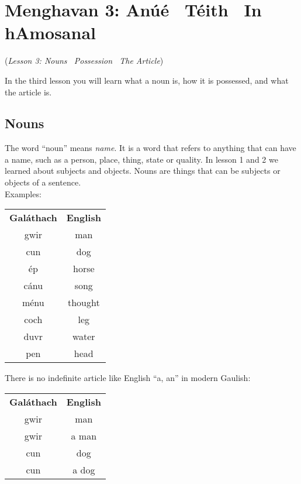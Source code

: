 \section{Menghavan 3: An\'{u}\'{e} \textendash\ T\'{e}ith \textendash\ In hAmosanal}
(\textit{Lesson 3: Nouns \textendash\ Possession \textendash\ The Article})

In the third lesson you will learn what a noun is, how it is possessed, and what the article is.\\

\subsection{Nouns}

The word ``noun'' means \textit{name}. It is a word that refers to anything that can have a name, such as a person, place, thing, state or quality. In lesson 1 and 2 we learned about subjects and objects. Nouns are things that can be subjects or objects of a sentence.\\

Examples:
\begin{table}[H]
\centering
\begin{tabular}{cc}
  \toprule
  \textbf{Gal\'{a}thach} & \textbf{English}\\
  \cmidrule(lr){1-1}\cmidrule(lr){2-2}
  gwir & man\\
  cun & dog\\
  \'{e}p & horse\\
  c\'{a}nu & song\\
  m\'{e}nu & thought\\
  coch & leg\\
  duvr & water\\
  pen & head\\
  \bottomrule
\end{tabular}
\label{examples_nouns}
\end{table}

There is no indefinite article like English ``a, an'' in modern Gaulish:
\begin{table}[H]
\centering
\begin{tabular}{cc}
  \toprule
  \textbf{Gal\'{a}thach} & \textbf{English}\\
  \cmidrule(lr){1-1}\cmidrule(lr){2-2}
  gwir & man\\
  gwir & a man\\
  cun & dog\\
  cun & a dog\\
  \bottomrule
\end{tabular}
\label{examples_no_indefinite_article}
\end{table}

